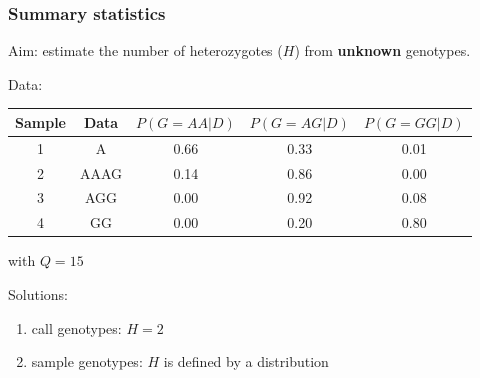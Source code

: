 \begin{frame}
\frametitle{Summary statistics}

	Aim: estimate the number of heterozygotes ($H$) from \textbf{unknown} genotypes.

	Data:
	\begin{center}
                \begin{tabular}{c | c | c | c | c}
                	Sample & Data & $P(G=AA|D)$ & $P(G=AG|D)$ & $P(G=GG|D)$\\
        		\hline
			1 & A & 0.66 & 0.33 & 0.01\\
			2 & AAAG & 0.14 & 0.86 & 0.00\\
			3 & AGG & 0.00 & 0.92 & 0.08\\
			4 & GG & 0.00 & 0.20 & 0.80\\
        		\hline
                \end{tabular}
		with $Q=15$
        \end{center}

	Solutions:
	\begin{enumerate}
		\item call genotypes: $H=2$
		\pause
		\item sample genotypes: $H$ is defined by a distribution 
	\end{enumerate}


\end{frame}


